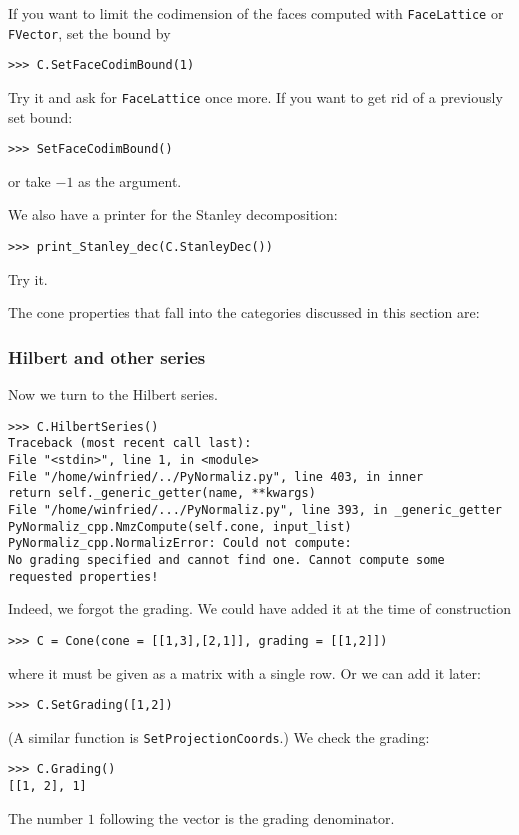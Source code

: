 \begin{small}
If you want to limit the codimension of the faces computed with \verb|FaceLattice| or \verb|FVector|, set the bound by
\begin{Verbatim}
>>> C.SetFaceCodimBound(1)
\end{Verbatim}
Try it and ask for \verb|FaceLattice| once more. If you want to get rid of a previously set bound:
\begin{Verbatim}
>>> SetFaceCodimBound()
\end{Verbatim}
or take $-1$ as the argument.

We also have a printer for the Stanley decomposition:
\begin{Verbatim}
>>> print_Stanley_dec(C.StanleyDec())
\end{Verbatim}
Try it.

The cone properties that fall into the categories discussed in this section are: 

\subsubsection{Hilbert and other series}

Now we turn to the Hilbert series.
\begin{Verbatim}
>>> C.HilbertSeries()
Traceback (most recent call last):
File "<stdin>", line 1, in <module>
File "/home/winfried/../PyNormaliz.py", line 403, in inner
return self._generic_getter(name, **kwargs)
File "/home/winfried/.../PyNormaliz.py", line 393, in _generic_getter
PyNormaliz_cpp.NmzCompute(self.cone, input_list)
PyNormaliz_cpp.NormalizError: Could not compute: 
No grading specified and cannot find one. Cannot compute some requested properties!
\end{Verbatim}
Indeed, we forgot the grading. We could have added it at the time of construction
\begin{Verbatim}
>>> C = Cone(cone = [[1,3],[2,1]], grading = [[1,2]])
\end{Verbatim}
where it must be given as a matrix with a single row. Or we can add it later:
\begin{Verbatim}
>>> C.SetGrading([1,2])
\end{Verbatim}
(A similar function is \verb|SetProjectionCoords|.) We check the grading:
\begin{Verbatim}
>>> C.Grading()
[[1, 2], 1]
\end{Verbatim}
The number $1$ following the vector is the grading denominator.


\end{small}
